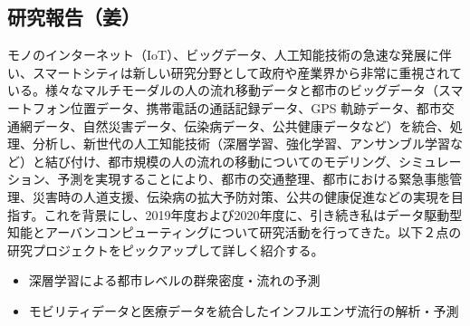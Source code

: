 \subsection{研究報告（姜）}
モノのインターネット（IoT）、ビッグデータ、人工知能技術の急速な発展に伴い、スマートシティは新しい研究分野として政府や産業界から非常に重視されている。様々なマルチモーダルの人の流れ移動データと都市のビッグデータ（スマートフォン位置データ、携帯電話の通話記録データ、GPS 軌跡データ、都市交通網データ、自然災害データ、伝染病データ、公共健康データなど）を統合、処理、分析し、新世代の人工知能技術（深層学習、強化学習、アンサンブル学習など）と結び付け、都市規模の人の流れの移動についてのモデリング、シミュレーション、予測を実現することにより、都市の交通整理、都市における緊急事態管理、災害時の人道支援、伝染病の拡大予防対策、公共の健康促進などの実現を目指す。これを背景にし、2019年度および2020年度に、引き続き私はデータ駆動型知能とアーバンコンピューティングについて研究活動を行ってきた。以下２点の研究プロジェクトをピックアップして詳しく紹介する。

\begin{itemize}
    \item 深層学習による都市レベルの群衆密度・流れの予測
    \item モビリティデータと医療データを統合したインフルエンザ流行の解析・予測
\end{itemize}

